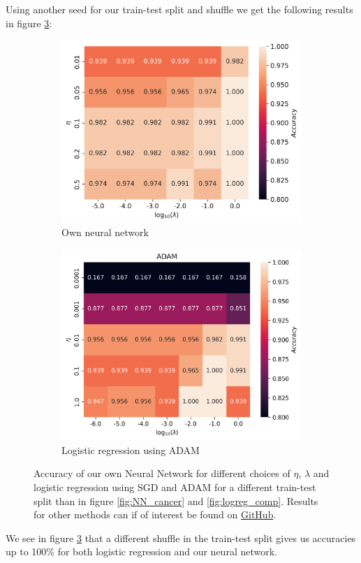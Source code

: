 \documentclass[11pt]{article}
\begin{document}
Using another seed for our train-test split and shuffle we get the following results in figure \ref{fig:cancer_best}:
\begin{figure}[H]
    \begin{subfigure}{.5\textwidth}
        \centering
        \includegraphics[width=\textwidth]{../figures/cancer_eta_lmb_best.png}
        \caption{Own neural network}
        \label{fig:}
    \end{subfigure}
    \begin{subfigure}{.5\textwidth}
        \centering
        \includegraphics[width=\textwidth]{../figures/logreg_ADAM_best.png}
        \caption{Logistic regression using ADAM}
        \label{fig:}
    \end{subfigure}
    \caption{Accuracy of our own Neural Network for different choices of $\eta$, $\lambda$ and logistic regression using SGD and ADAM for a different train-test split than in figure \ref{fig:NN_cancer} and \ref{fig:logreg_comp}. Results for other methods can if of interest be found on \href{https://github.com/Fslippe/FYS-STK4155/tree/main/project2}{GitHub}.}
    \label{fig:cancer_best}
\end{figure}
We see in figure \ref{fig:cancer_best} that a different shuffle in the train-test split gives us accuracies up to 100\% for both logistic regression and our neural network.
\end{document}
